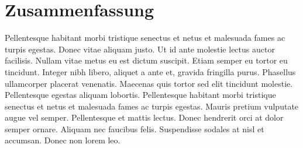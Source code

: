 \chapter*{Zusammenfassung}
Pellentesque habitant morbi tristique senectus et netus et malesuada fames ac turpis egestas. Donec vitae aliquam justo. Ut id ante molestie lectus auctor facilisis. Nullam vitae metus eu est dictum suscipit. Etiam semper eu tortor eu tincidunt. Integer nibh libero, aliquet a ante et, gravida fringilla purus. Phasellus ullamcorper placerat venenatis. Maecenas quis tortor sed elit tincidunt molestie. Pellentesque egestas aliquam lobortis. Pellentesque habitant morbi tristique senectus et netus et malesuada fames ac turpis egestas. Mauris pretium vulputate augue vel semper. Pellentesque et mattis lectus. Donec hendrerit orci at dolor semper ornare. Aliquam nec faucibus felis. Suspendisse sodales at nisl et accumsan. Donec non lorem leo. 